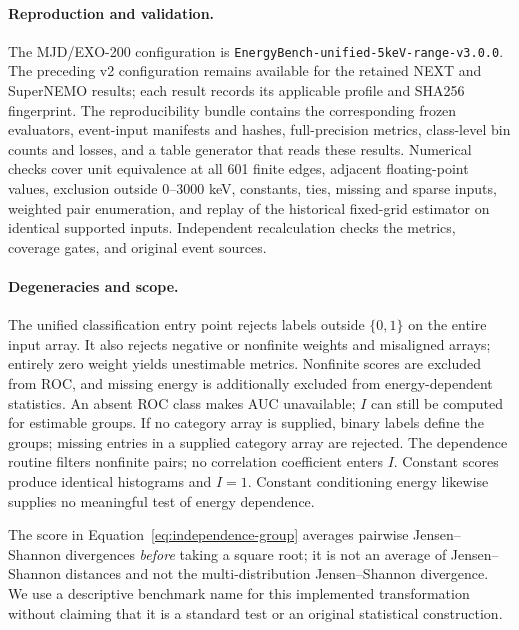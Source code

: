 \paragraph{Reproduction and validation.}
The MJD/EXO-200 configuration is \texttt{EnergyBench-unified-}\allowbreak\texttt{5keV-range-v3.0.0}.
The preceding v2 configuration remains available for the retained NEXT and
SuperNEMO results; each result records its applicable profile and SHA256
fingerprint. The reproducibility bundle contains the corresponding frozen
evaluators, event-input manifests and hashes, full-precision
metrics, class-level bin counts and losses, and a table generator that reads
these results. Numerical checks cover unit equivalence at all 601 finite
edges, adjacent floating-point values, exclusion outside 0--3000 keV, constants, ties,
missing and sparse inputs, weighted pair enumeration, and replay of the
historical fixed-grid estimator on identical supported inputs. Independent
recalculation checks the metrics, coverage gates, and original event sources.

\paragraph{Degeneracies and scope.}
The unified classification entry point rejects labels outside $\{0,1\}$
on the entire input array. It also rejects negative or nonfinite weights and
misaligned arrays; entirely zero weight yields unestimable metrics. Nonfinite scores are excluded
from ROC, and missing energy is additionally excluded from energy-dependent
statistics. An absent ROC class makes AUC unavailable; $I$ can still be
computed for estimable groups. If no category array is supplied, binary labels
define the groups; missing entries in a supplied category array are rejected.
The dependence routine filters nonfinite pairs; no correlation coefficient
enters $I$. Constant scores produce identical histograms
and $I=1$. Constant conditioning energy likewise supplies no meaningful
test of energy dependence.

The score in Equation~\ref{eq:independence-group} averages pairwise
Jensen--Shannon divergences \emph{before} taking a square root; it is not an
average of Jensen--Shannon distances and not the multi-distribution
Jensen--Shannon divergence. We use a descriptive benchmark name for this
implemented transformation without claiming that it is a standard test or
an original statistical construction.
